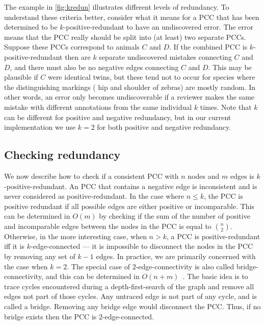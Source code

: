 The example in \cref{fig:kredun} illustrates different levels of redundancy.
To understand these criteria better, consider what it means for a PCC that has been determined to be
  $k$-positive-redundant to have an undiscovered error.
The error means that the PCC really should be split into (at least) two separate PCCs.
Suppose these PCCs correspond to animals $C$ and $D$.
If the combined PCC is $k$-positive-redundant then are $k$ separate undiscovered mistakes connecting $C$ and $D$,
  and there must also be no negative edges connecting $C$ and $D$.
This may be plausible if $C$ were identical twins, but these tend not to occur for species where the
  distinguishing markings (\eg{} hip and shoulder of zebras) are mostly random.
In other words, an error only becomes undiscoverable if a reviewer makes the same mistake with different
  annotations from the same individual $k$ times.
Note that $k$ can be different for positive and negative redundancy, but in our current implementation we use
  $k=2$ for both positive and negative redundancy.


\subsection{Checking redundancy}

We now describe how to check if a consistent PCC with $n$ nodes and $m$ edges is $k$-positive-redundant.
An PCC that contains a negative edge is inconsistent and is never considered as positive-redundant.
In the case where $n \leq k$, the PCC is positive redundant if all possible edges are either positive or
  incomparable.
This can be determined in $O(m)$ by checking if the sum of the number of positive and incomparable edges between
  the nodes in the PCC is equal to $\binom{n}{2}$.
Otherwise, in the more interesting case, when $n > k$, a PCC is positive-redundant iff it is $k$-edge-connected
  --- \ie{} it is impossible to disconnect the nodes in the PCC by removing any set of $k - 1$ edges.
In practice, we are primarily concerned with the case when $k=2$.
The special case of $2$-edge-connectivity is also called bridge-connectivity, and this can be determined in %
$O(n + m)$~\cite{eswaran_augmentation_1976,wang_simple_2015}.
The basic idea is to trace cycles encountered during a depth-first-search of the graph and remove all edges not
  part of those cycles.
Any untraced edge is not part of any cycle, and is called a bridge.
Removing any bridge edge would disconnect the PCC.
Thus, if no bridge exists then the PCC is $2$-edge-connected.

